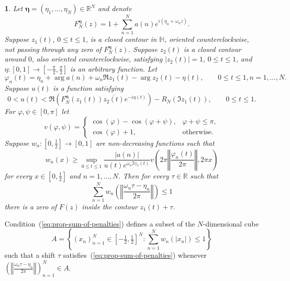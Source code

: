 \documentclass[oneside,english]{amsart}
\numberwithin{equation}{section}
\numberwithin{figure}{section}
\theoremstyle{plain}
\theoremstyle{plain}
\newtheorem{prop}{\protect\propositionname}
\theoremstyle{plain}
\theoremstyle{definition}
\providecommand{\propositionname}{Proposition}
\begin{document}
\begin{prop}
\label{prop:sufficient-condition}Let $\boldsymbol{\eta}=(\eta_{1},\dotsc,\eta_{N})\in\mathbb{R}^{N}$
and denote
\[
F_{N}^{\boldsymbol{\eta}}(z)=1+\sum_{n=1}^{N}a(n)e^{i\left(\eta_{n}+\omega_{n}z\right)}.
\]
Suppose $z_{1}(t)$, $0\leq t\leq1$, is a closed contour in $\mathbb{H}$,
oriented counterclockwise, not passing through any zero of $F_{N}^{\boldsymbol{\eta}}(z)$.
Suppose $z_{2}(t)$ is a closed contour around $0$, also oriented
counterclockwise, satisfying $\left|z_{2}(t)\right|=1$, $0\leq t\leq1$,
and $\eta:[0,1]\to[-\tfrac{\pi}{2},\tfrac{\pi}{2}]$ is an arbitrary
function. Let
\[
\varphi_{n}(t)=\eta_{n}+\arg a(n)+\omega_{n}\Re z_{1}(t)-\arg z_{2}(t)-\eta(t),\qquad0\leq t\leq1,n=1,\dotsc,N.
\]
Suppose $u(t)$ is a function satisfying
\[
0<u(t)<\Re\left(F_{N}^{\boldsymbol{\eta}}(z_{1}(t))\overline{z_{2}(t)}e^{-i\eta(t)}\right)-R_{N}(\Im z_{1}(t)),\qquad0\leq t\leq1.
\]
For $\varphi,\psi\in[0,\pi]$ let 
\[
v(\varphi,\psi)=\begin{cases}
\cos\left(\varphi\right)-\cos\left(\varphi+\psi\right), & \varphi+\psi\leq\pi,\\
\cos\left(\varphi\right)+1, & \text{otherwise.}
\end{cases}
\]
Suppose $w_{n}:[0,\tfrac{1}{2}]\to[0,1]$ are non-decreasing functions
such that
\begin{equation}
w_{n}(x)\geq\sup_{0\leq t\leq1}\frac{\left|a(n)\right|}{u(t)e^{\omega_{n}\Im z_{1}(t)}}v\left(2\pi\left\Vert \frac{\varphi_{n}(t)}{2\pi}\right\Vert ,2\pi x\right)\label{eq:wn(x)-assumption}
\end{equation}
for every $x\in[0,\tfrac{1}{2}]$ and $n=1,\dotsc,N$. Then for every
$\tau\in\mathbb{R}$ such that
\begin{equation}
\sum_{n=1}^{N}w_{n}\left(\left\Vert \frac{\omega_{n}\tau-\eta_{n}}{2\pi}\right\Vert \right)\leq1\label{eq:prop-sum-of-penalties}
\end{equation}
there is a zero of $F(z)$ inside the contour $z_{1}(t)+\tau$.
\end{prop}
Condition~(\ref{eq:prop-sum-of-penalties}) defines a subset of the
$N$-dimensional cube 
\begin{equation}
A=\left\{ \left(x_{n}\right)_{n=1}^{N}\in\left[-\tfrac{1}{2},\tfrac{1}{2}\right]^{N}:\sum_{n=1}^{N}w_{n}\left(\left|x_{n}\right|\right)\leq1\right\} \label{eq:solution-set}
\end{equation}
such that a shift $\tau$ satisfies~(\ref{eq:prop-sum-of-penalties})
whenever $\left(\left\Vert \frac{\omega_{n}\tau-\eta_{n}}{2\pi}\right\Vert \right)_{n=1}^{N}\in A$.
\end{document}
